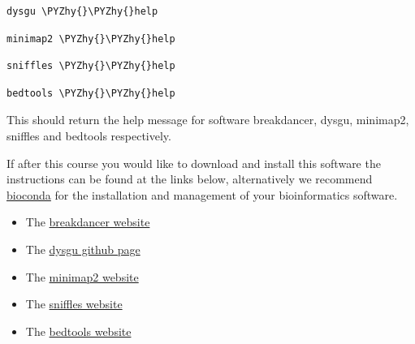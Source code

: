 \documentclass[11pt]{article}
\makeatletter
\providecommand{\tightlist}{%
      \setlength{\itemsep}{0pt}\setlength{\parskip}{0pt}}
\def\PYZhy{\char`\-}
\newcommand{\boxspacing}{\kern\kvtcb@left@rule\kern\kvtcb@boxsep}
\newcommand{\prompt}[4]{
        {\ttfamily\llap{{\color{#2}[#3]:\hspace{3pt}#4}}\vspace{-\baselineskip}}
    }
\makeatother
\begin{document}
    \begin{tcolorbox}[breakable, size=fbox, boxrule=1pt, pad at break*=1mm,colback=cellbackground, colframe=cellborder]
\prompt{In}{incolor}{ }{\boxspacing}
\begin{Verbatim}[commandchars=\\\{\}]
dysgu \PYZhy{}\PYZhy{}help
\end{Verbatim}
\end{tcolorbox}

    \begin{tcolorbox}[breakable, size=fbox, boxrule=1pt, pad at break*=1mm,colback=cellbackground, colframe=cellborder]
\prompt{In}{incolor}{ }{\boxspacing}
\begin{Verbatim}[commandchars=\\\{\}]
minimap2 \PYZhy{}\PYZhy{}help
\end{Verbatim}
\end{tcolorbox}

    \begin{tcolorbox}[breakable, size=fbox, boxrule=1pt, pad at break*=1mm,colback=cellbackground, colframe=cellborder]
\prompt{In}{incolor}{ }{\boxspacing}
\begin{Verbatim}[commandchars=\\\{\}]
sniffles \PYZhy{}\PYZhy{}help
\end{Verbatim}
\end{tcolorbox}

    \begin{tcolorbox}[breakable, size=fbox, boxrule=1pt, pad at break*=1mm,colback=cellbackground, colframe=cellborder]
\prompt{In}{incolor}{ }{\boxspacing}
\begin{Verbatim}[commandchars=\\\{\}]
bedtools \PYZhy{}\PYZhy{}help
\end{Verbatim}
\end{tcolorbox}

    This should return the help message for software breakdancer, dysgu,
minimap2, sniffles and bedtools respectively.

If after this course you would like to download and install this
software the instructions can be found at the links below, alternatively
we recommend \href{https://bioconda.github.io/}{bioconda} for the
installation and management of your bioinformatics software.

\begin{itemize}
\tightlist
\item
  The \href{http://breakdancer.sourceforge.net/}{breakdancer website}
\item
  The \href{https://github.com/kcleal/dysgu}{dysgu github page}
\item
  The \href{https://lh3.github.io/minimap2/}{minimap2 website}
\item
  The \href{https://github.com/fritzsedlazeck/Sniffles/wiki}{sniffles
  website}
\item
  The \href{https://bedtools.readthedocs.io/}{bedtools website}
\end{itemize}
\end{document}
